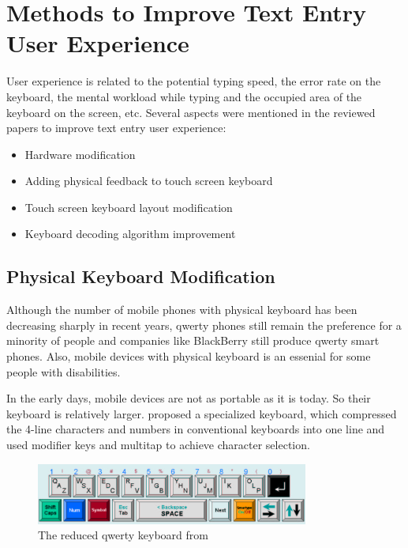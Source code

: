 \documentclass[11pt]{article}
\begin{document}
\section{Methods to Improve Text Entry User Experience}\label{section-improvement}
User experience is related to the potential typing speed, the error rate on the keyboard, the mental workload while typing and the occupied area of the keyboard on the screen, etc. Several aspects were mentioned in the reviewed papers to improve text entry user experience: 
\begin{itemize}
    \item Hardware modification
    \item Adding physical feedback to touch screen keyboard
    \item Touch screen keyboard layout modification
    \item Keyboard decoding algorithm improvement
\end{itemize}
\subsection{Physical Keyboard Modification}
Although the number of mobile phones with physical keyboard has been decreasing sharply in recent years, qwerty phones still remain the preference for a minority of people and companies like BlackBerry still produce qwerty smart phones. Also, mobile devices with physical keyboard is an essenial for some people with disabilities. 

In the early days, mobile devices are not as portable as it is today. So their keyboard is relatively larger. \citet{10.1145/985921.986082} proposed a specialized keyboard, which compressed the 4-line characters and numbers in conventional keyboards into one line and used modifier keys and multitap to achieve character selection.
\begin{figure}[H]
  \centering
  \includegraphics[width=0.8\textwidth]{ReducedQWERTYKeyboard.png}
  \caption{The reduced qwerty keyboard from \citep{10.1145/985921.986082}}
  \label{fig:reducedKeyboard}
\end{figure}
\end{document}
